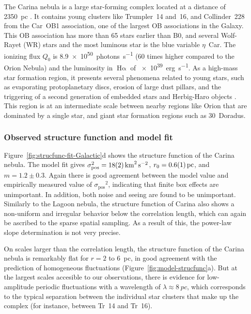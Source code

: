 \documentclass[fleqn,usenatbib, useAMS, a4paper]{mnras}
\newcommand\startNEW{\color{black}}
\newcommand\stopNEW{\color{black}}
\newcommand\pos{\ensuremath{_{\mathrm{pos}}}}
\newcommand\ha{\ensuremath{\text{H}\upalpha}}
\begin{document}
The Carina nebula is a large star-forming complex located at a distance of \SI{2 350}{pc} \citetext{\SI{1}{\arcsecond} = \SI{0.01}{pc}; \citealp{2006ApJ...644.1151S}}.
It contains young clusters like Trumpler~14 and~16, and Collinder~228 from the Car~OB1 association, one of the largest OB associations in the Galaxy.
This OB association has more than 65 stars earlier than B0, and several Wolf-Rayet (WR) stars and the most luminous star is the blue variable $\eta$~Car.
The ionizing flux \(Q_0\) is \SI{8.9e50}{photons.s^{-1}} \citep{2008hsf2.book..138S} (60 times higher compared to the Orion Nebula) and the luminosity in \ha{} of \SI{e39}{erg.s^{-1}}.
As a high-mass star formation region, it presents several phenomena related to young stars,
such as evaporating protoplanetary discs, erosion of large dust pillars, and the triggering of a second generation of embedded stars and Herbig-Haro objects \citetext{see \citealp{2008hsf2.book..138S} and reference therein}.
\startNEW
This region is at an intermediate scale between nearby regions like Orion
that are dominated by a single star, and giant star formation regions such as 30~Doradus.
\stopNEW

\startNEW
\subsubsection{Observed structure function and model fit}
\label{sec:observ-struct-funct-carina}
\stopNEW

Figure~\ref{fig:strucfunc-fit-Galactic}d shows the structure function of the Carina nebula.
\startNEW
The model fit gives \(\sigma\pos^2 = \SI{18 \pm 2}{km^{2}.s^{-2}}\), \(r_0 = \SI{0.6 \pm 0.1}{pc} \), and \(m = 1.2 \pm 0.3\).
Again there is good agreement between the model value and empirically measured
value of \(\sigma\pos^2\),
indicating that finite box effects are unimportant. In addition, both noise and seeing are
found to be unimportant. 
Similarly to the Lagoon nebula,
the structure function of Carina also shows a non-uniform and irregular behavior
below the correlation length, which can again be ascribed to the sparse spatial sampling.
As a result of this, the power-law slope determination is not very precise.

On scales larger than the correlation length,
the structure function of the Carina nebula is remarkably flat
for \(r = 2\) to \SI{6}{pc},
in good agreement with the prediction of homogeneous fluctuations
(Figure~\ref{fig:model-strucfunc}a).
But at the largest scales accesible to our observations, there is evidence for low-amplitude
periodic fluctuations with a wavelength of \(\lambda \approx \SI{8}{pc}\),
which corresponds to the typical separation
between the individual star clusters that make up the complex
(for instance, between Tr~14 and Tr~16).
\stopNEW
\end{document}
